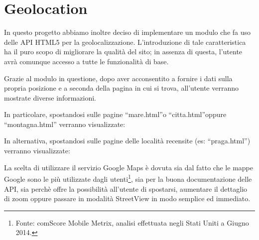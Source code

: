 \section{Geolocation}
In questo progetto abbiamo inoltre deciso di implementare un modulo che fa uso delle API HTML5 per la geolocalizzazione. L'introduzione di tale caratteristica ha il puro scopo di migliorare la qualità del sito; in assenza di questa, l'utente avrà comunque accesso a tutte le funzionalità di base.
\begin{flushleft}
Grazie al modulo in questione, dopo aver acconsentito a fornire i dati sulla propria posizione e a seconda della pagina in cui si trova, all'utente verranno mostrate diverse informazioni.
\end{flushleft}

\begin{flushleft}
In particolare, spostandosi sulle pagine “mare.html”o “citta.html”oppure “montagna.html” verranno visualizzate:\\
\end{flushleft}

\begin{flushleft}
In alternativa, spostandosi sulle pagine delle località recensite (es: “praga.html”) verranno visualizzate:\\
La scelta di utilizzare il servizio Google Maps è dovuta sia dal fatto che le mappe Google sono le più utilizzate dagli utenti\footnote{ Fonte: comScore Mobile Metrix, analisi effettuata negli Stati Uniti a Giugno 2014.
}, sia per la buona documentazione delle API, sia perchè offre la possibilità all'utente di spostarsi, aumentare il dettaglio di zoom oppure passare in modalità StreetView in modo semplice ed immediato.\\
\end{flushleft}

